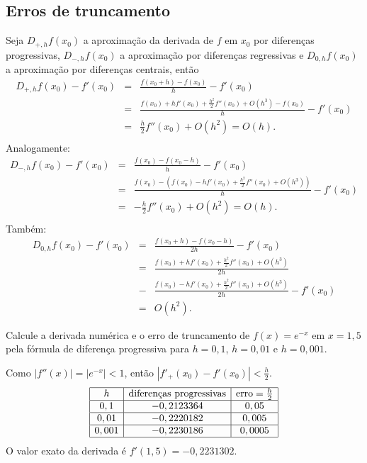 \subsection{Erros de truncamento}
Seja $D_{+,h}f(x_0)$ a aproximação da derivada de $f$ em $x_0$ por diferenças progressivas, $D_{-,h}f(x_0)$ a aproximação por diferenças regressivas e $D_{0,h}f(x_0)$ a aproximação por diferenças centrais, então
\begin{eqnarray*}
D_{+,h}f(x_0)-f'(x_0)&=&\frac{f(x_0+h)-f(x_0)}{h}-f'(x_0)\\
&=&\frac{f(x_0)+hf'(x_0)+\frac{h^2}{2}f''(x_0)+O(h^3)-f(x_0)}{h}-f'(x_0)\\
&=&\frac{h}{2}f''(x_0)+O(h^2)=O(h).\\
\end{eqnarray*}
Analogamente:
\begin{eqnarray*}
D_{-,h}f(x_0)-f'(x_0)&=&\frac{f(x_0)-f(x_0-h)}{h}-f'(x_0)\\
&=&\frac{f(x_0)-\left(f(x_0)-hf'(x_0)+\frac{h^2}{2}f''(x_0)+O(h^3)\right)}{h}-f'(x_0)\\
&=&-\frac{h}{2}f''(x_0)+O(h^2)=O(h).\\
\end{eqnarray*}
Também:
\begin{eqnarray*}
D_{0,h}f(x_0)-f'(x_0)&=& \frac{f(x_0+h)-f(x_0-h)}{2h}-f'(x_0)\\
&=& \frac{f(x_0)+hf'(x_0)+\frac{h^2}{2}f''(x_0)+O(h^3)}{2h} \\
&-& \frac{f(x_0)-hf'(x_0)+\frac{h^2}{2}f''(x_0)+O(h^3)}{2h}-f'(x_0)\\
&=& O(h^2).
\end{eqnarray*}

\begin{ex}
Calcule a derivada numérica e o erro de truncamento de $f(x)=e^{-x}$ em $x=1,5$ pela fórmula de diferença progressiva para $h=0,1$, $h=0,01$ e $h=0,001$.
\end{ex}
\begin{sol}
Como $|f''(x)|=|e^{-x}|<1$, então $|f'_+(x_0)-f'(x_0)|<\frac{h}{2}$.
$$
\begin{array}{|c|c|c|}
\hline
 h&\hbox{diferenças progressivas} & \hbox{erro}=\frac{h}{2}\\
\hline
0,1&- 0,2123364 & 0,05\\
\hline
0,01 &- 0,2220182 & 0,005\\
\hline
0,001 &- 0,2230186 & 0,0005\\
\hline
\end{array}
$$
O valor exato da derivada é $f'(1,5)=-0,2231302$.
\end{sol}

